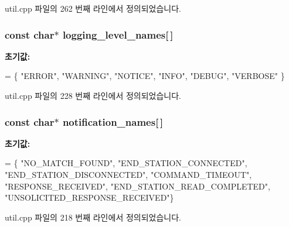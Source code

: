 util.\+cpp 파일의 262 번째 라인에서 정의되었습니다.

\subsubsection[{\texorpdfstring{logging\+\_\+level\+\_\+names}{logging_level_names}}]{\setlength{\rightskip}{0pt plus 5cm}const char$\ast$ logging\+\_\+level\+\_\+names\mbox{[}$\,$\mbox{]}}\hypertarget{namespaceavdecc__lib_1_1utility_a214ecdfb4244fd3e0afd0e5a6a81606f}{}\label{namespaceavdecc__lib_1_1utility_a214ecdfb4244fd3e0afd0e5a6a81606f}
{\bfseries 초기값\+:}
\begin{DoxyCode}
=
        \{
            \textcolor{stringliteral}{"ERROR"},   
            \textcolor{stringliteral}{"WARNING"}, 
            \textcolor{stringliteral}{"NOTICE"},  
            \textcolor{stringliteral}{"INFO"},    
            \textcolor{stringliteral}{"DEBUG"},   
            \textcolor{stringliteral}{"VERBOSE"}  
    \}
\end{DoxyCode}


util.\+cpp 파일의 228 번째 라인에서 정의되었습니다.

\subsubsection[{\texorpdfstring{notification\+\_\+names}{notification_names}}]{\setlength{\rightskip}{0pt plus 5cm}const char$\ast$ notification\+\_\+names\mbox{[}$\,$\mbox{]}}\hypertarget{namespaceavdecc__lib_1_1utility_a0ac9ebfa3d02f075ec4fbfc360dae4ee}{}\label{namespaceavdecc__lib_1_1utility_a0ac9ebfa3d02f075ec4fbfc360dae4ee}
{\bfseries 초기값\+:}
\begin{DoxyCode}
=
        \{
            \textcolor{stringliteral}{"NO\_MATCH\_FOUND"},
            \textcolor{stringliteral}{"END\_STATION\_CONNECTED"},
            \textcolor{stringliteral}{"END\_STATION\_DISCONNECTED"},
            \textcolor{stringliteral}{"COMMAND\_TIMEOUT"},
            \textcolor{stringliteral}{"RESPONSE\_RECEIVED"},
            \textcolor{stringliteral}{"END\_STATION\_READ\_COMPLETED"},
            \textcolor{stringliteral}{"UNSOLICITED\_RESPONSE\_RECEIVED"}\}
\end{DoxyCode}


util.\+cpp 파일의 218 번째 라인에서 정의되었습니다.

